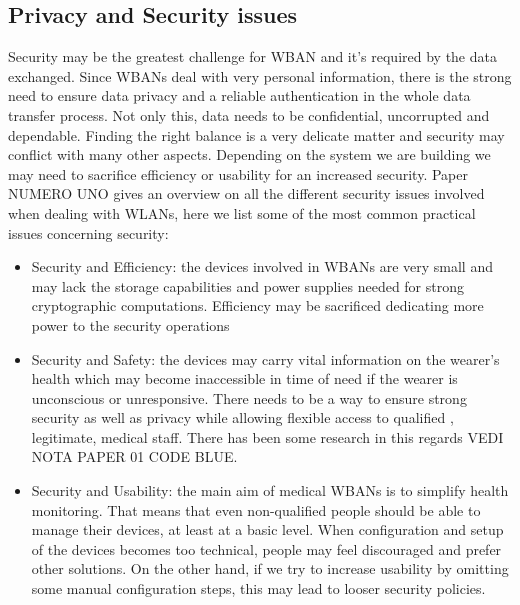 \documentclass[conference]{IEEEtran}
\begin{document}
\subsection {Privacy and Security issues}
	Security may be the greatest challenge for WBAN and it’s required by the data exchanged. Since WBANs deal with very personal information, there is the strong need to ensure data privacy and a reliable authentication in the whole data transfer process. Not only this, data needs to be confidential, uncorrupted and dependable. Finding the right balance is a very delicate matter and security may conflict with many other aspects. Depending on the system we are building we may need to sacrifice efficiency or usability for an increased security. Paper NUMERO UNO gives an overview on all the different security issues involved when dealing with WLANs, here we list some of the most common practical issues concerning security:
		\begin{itemize}
			\item Security and Efficiency: the devices involved in WBANs are very small and may lack the storage capabilities and power supplies needed for strong cryptographic computations. Efficiency may be sacrificed dedicating more power to the security operations
			\item  Security and Safety: the devices may carry vital information on the wearer’s health which may become inaccessible in time of need if the wearer is unconscious or unresponsive. There needs to be a way to ensure strong security as well as privacy while allowing flexible access to qualified , legitimate, medical staff. There has been some research in this regards VEDI NOTA PAPER 01 CODE BLUE.
			\item Security and Usability: the main aim of medical WBANs is to simplify health monitoring. That means that even non-qualified people should be able to manage their devices, at least at a basic level. When configuration and setup of the devices becomes too technical, people may feel discouraged and prefer other solutions. On the other hand, if we try to increase usability by omitting some manual configuration steps, this may lead to looser security policies.
		\end{itemize}
\end{document}
